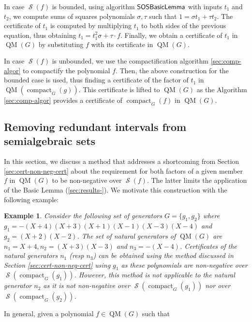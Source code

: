 \documentclass[preprint,12pt,authoryear]{elsarticle}
\newtheorem{example}[theorem]{Example}
\newenvironment{example1}
  {\begin{example}\rm}
  {\end{example}}
\DeclareMathOperator{\quadmod}{QM}
\DeclareMathOperator{\semialgebraic}{\mathcal{S}}
\DeclareMathOperator{\compact}{compact}
\DeclareMathOperator{\algSOSBasicLemma}{\sf SOSBasicLemma}
\begin{document}
In case $\semialgebraic(f)$ is bounded, using algorithm $\algSOSBasicLemma$ with
inputs $t_1$ and $t_2$, we compute sums of squares polynomials $\sigma, \tau$
such that $1 = \sigma t_1 + \tau t_2$. The certificate of $t_1$ is computed by
multiplying $t_1$ to both sides of the previous equation, thus obtaining
$t_1 = t_1^2 \sigma + \tau \cdot f$. Finally, we obtain a certificate of $t_1$
in $\quadmod(G)$ by substituting $f$ with its certificate in $\quadmod(G)$.

In case $\semialgebraic(f)$ is unbounded, we use the compactification algorithm
\ref{sec:comp-algor} to compactify the polynomial $f$. Then, the above
construction for the bounded case is used, thus finding a certificate of the
factor of $t_1$ in $\quadmod(\compact_G(g))$. This certificate is lifted to
$\quadmod(G)$ as the Algorithm \ref{sec:comp-algor} provides a certificate of
$\compact_G(f)$ in $\quadmod(G)$.

 \subsection{Removing redundant intervals from semialgebraic sets}
\label{sec:remov-redund-strictl-9}

In this section, we discuss a method that addresses a shortcoming from Section
\ref{sec:cert-non-neg-cert} about the requirement for both factors of a given
member $f$ in $\quadmod(G)$ to be non-negative over $\semialgebraic(f)$. The
latter limits the application of the Basic Lemma (\th\ref{sec:results-}). We
motivate this construction with the following example:

\begin{example1}
  \th\label{sec:remov-redund-strictl}
 Consider the following set of generators $G = \{g_1, g_2\}$ where
  $g_1 = -(X + 4)(X + 3)(X + 1)(X - 1)(X - 3)(X - 4)$ and
  $g_2 = (X + 2)(X - 2)$. The set of natural generators of $\quadmod(G)$ are
  $n_1 = X + 4, n_2 = (X + 3)(X - 3)$ and $n_3 = -(X - 4)$. Certificates of the
  natural generators $n_1$ (resp $n_3$) can be obtained using the method
  discussed in Section \ref{sec:cert-non-neg-cert} using $g_1$ as these
  polynomials are non-negative over $\semialgebraic(\compact_G(g_1))$. However,
  this method is not applicable to the natural generator $n_2$ as it is not
  non-negative over $\semialgebraic(\compact_G(g_1))$ nor over
  $\semialgebraic(\compact_G(g_2))$.
\end{example1}

In general, given a polynomial $f \in \quadmod(G)$ such that
\end{document}
